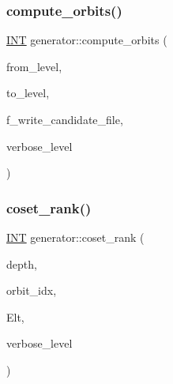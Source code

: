 \mbox{\label{classgenerator_a23989bc20ecaaed39c4119c758367f40}} 
\subsubsection{\texorpdfstring{compute\+\_\+orbits()}{compute\_orbits()}}
{\footnotesize\ttfamily \mbox{\hyperlink{galois_8h_a09fddde158a3a20bd2dcadb609de11dc}{I\+NT}} generator\+::compute\+\_\+orbits (\begin{DoxyParamCaption}\item[{\mbox{\hyperlink{galois_8h_a09fddde158a3a20bd2dcadb609de11dc}{I\+NT}}}]{from\+\_\+level,  }\item[{\mbox{\hyperlink{galois_8h_a09fddde158a3a20bd2dcadb609de11dc}{I\+NT}}}]{to\+\_\+level,  }\item[{\mbox{\hyperlink{galois_8h_a09fddde158a3a20bd2dcadb609de11dc}{I\+NT}}}]{f\+\_\+write\+\_\+candidate\+\_\+file,  }\item[{\mbox{\hyperlink{galois_8h_a09fddde158a3a20bd2dcadb609de11dc}{I\+NT}}}]{verbose\+\_\+level }\end{DoxyParamCaption})}

\mbox{\label{classgenerator_aee00240c0ae71885dd9d23b5423c56d9}} 
\subsubsection{\texorpdfstring{coset\+\_\+rank()}{coset\_rank()}}
{\footnotesize\ttfamily \mbox{\hyperlink{galois_8h_a09fddde158a3a20bd2dcadb609de11dc}{I\+NT}} generator\+::coset\+\_\+rank (\begin{DoxyParamCaption}\item[{\mbox{\hyperlink{galois_8h_a09fddde158a3a20bd2dcadb609de11dc}{I\+NT}}}]{depth,  }\item[{\mbox{\hyperlink{galois_8h_a09fddde158a3a20bd2dcadb609de11dc}{I\+NT}}}]{orbit\+\_\+idx,  }\item[{\mbox{\hyperlink{galois_8h_a09fddde158a3a20bd2dcadb609de11dc}{I\+NT}} $\ast$}]{Elt,  }\item[{\mbox{\hyperlink{galois_8h_a09fddde158a3a20bd2dcadb609de11dc}{I\+NT}}}]{verbose\+\_\+level }\end{DoxyParamCaption})}

